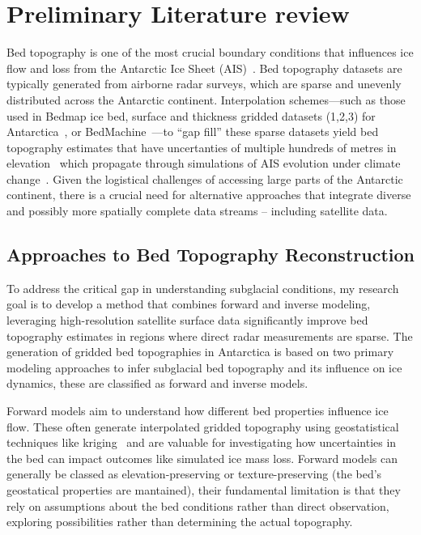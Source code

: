 \chapter{Preliminary Literature review}\label{review}
Bed topography is one of the most crucial boundary conditions that influences ice flow and loss from the Antarctic Ice Sheet (AIS)~\cite{Morlighem_2020}. Bed topography datasets are typically generated from airborne radar surveys, which are sparse and unevenly distributed across the Antarctic continent. Interpolation schemes—such as those used in Bedmap ice bed, surface and thickness gridded datasets (1,2,3) for Antarctica~\cite{Lythe_2001, Fretwell_2013, Pritchard_2025}, or BedMachine~\cite{Morlighem_2017}—to ``gap fill'' these sparse datasets yield bed topography estimates that have uncertanties of multiple hundreds of metres in elevation~\cite{Morlighem_2020} which propagate through simulations of AIS evolution under climate change~\cite{Castleman_2022}. Given the logistical challenges of accessing large parts of the Antarctic continent, there is a crucial need for alternative approaches that integrate diverse and possibly more spatially complete data streams – including satellite data.

\section{Approaches to Bed Topography Reconstruction}
To address the critical gap in understanding subglacial conditions, my research goal is to develop a method that combines forward and inverse modeling, leveraging high-resolution satellite surface data significantly improve bed topography estimates in regions where direct radar measurements are sparse.
The generation of gridded bed topographies in Antarctica is based on two primary modeling approaches to infer subglacial bed topography and its influence on ice dynamics, these are classified as forward and inverse models. 

Forward models aim to understand how different bed properties influence ice flow. These often generate interpolated gridded topography using geostatistical techniques like kriging~\cite{Mackie_2020} and are valuable for investigating how uncertainties in the bed can impact outcomes like simulated ice mass loss. Forward models can generally be classed as elevation-preserving or texture-preserving (the bed's geostatical properties are mantained), their fundamental limitation is that they rely on assumptions about the bed conditions rather than direct observation, exploring possibilities rather than determining the actual topography. 

